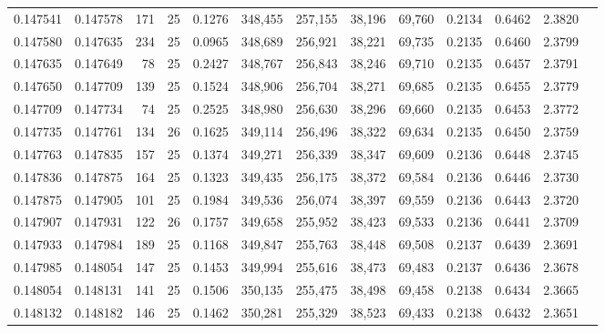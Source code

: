 \begin{tabular}{rrrrrrrrrrrrr}
0.147541 & 0.147578 & 171 &  25 &                                     0.1276 & 348,455 & 257,155 &  38,196 &  69,760 & 0.2134 & 0.6462 & 2.3820 \\
0.147580 & 0.147635 & 234 &  25 &                                     0.0965 & 348,689 & 256,921 &  38,221 &  69,735 & 0.2135 & 0.6460 & 2.3799 \\
0.147635 & 0.147649 &  78 &  25 &                                     0.2427 & 348,767 & 256,843 &  38,246 &  69,710 & 0.2135 & 0.6457 & 2.3791 \\
0.147650 & 0.147709 & 139 &  25 &                                     0.1524 & 348,906 & 256,704 &  38,271 &  69,685 & 0.2135 & 0.6455 & 2.3779 \\
0.147709 & 0.147734 &  74 &  25 &                                     0.2525 & 348,980 & 256,630 &  38,296 &  69,660 & 0.2135 & 0.6453 & 2.3772 \\
0.147735 & 0.147761 & 134 &  26 &                                     0.1625 & 349,114 & 256,496 &  38,322 &  69,634 & 0.2135 & 0.6450 & 2.3759 \\
0.147763 & 0.147835 & 157 &  25 &                                     0.1374 & 349,271 & 256,339 &  38,347 &  69,609 & 0.2136 & 0.6448 & 2.3745 \\
0.147836 & 0.147875 & 164 &  25 &                                     0.1323 & 349,435 & 256,175 &  38,372 &  69,584 & 0.2136 & 0.6446 & 2.3730 \\
0.147875 & 0.147905 & 101 &  25 &                                     0.1984 & 349,536 & 256,074 &  38,397 &  69,559 & 0.2136 & 0.6443 & 2.3720 \\
0.147907 & 0.147931 & 122 &  26 &                                     0.1757 & 349,658 & 255,952 &  38,423 &  69,533 & 0.2136 & 0.6441 & 2.3709 \\
0.147933 & 0.147984 & 189 &  25 &                                     0.1168 & 349,847 & 255,763 &  38,448 &  69,508 & 0.2137 & 0.6439 & 2.3691 \\
0.147985 & 0.148054 & 147 &  25 &                                     0.1453 & 349,994 & 255,616 &  38,473 &  69,483 & 0.2137 & 0.6436 & 2.3678 \\
0.148054 & 0.148131 & 141 &  25 &                                     0.1506 & 350,135 & 255,475 &  38,498 &  69,458 & 0.2138 & 0.6434 & 2.3665 \\
0.148132 & 0.148182 & 146 &  25 &                                     0.1462 & 350,281 & 255,329 &  38,523 &  69,433 & 0.2138 & 0.6432 & 2.3651 \\

\end{tabular}
